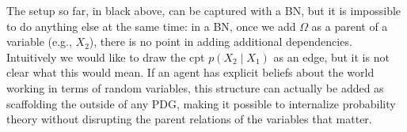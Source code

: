 \documentclass{article}
\newcommand{\MN}{PDG}
\numberwithin{equation}{section}
\begin{document}
{\begin{example}
\begin{center}
{}
		\end{center}
		The setup so far, in black above, can be captured with
                a BN, but it is impossible to do anything else at the
                same time: in a BN, once we add $\Omega$ as a parent
                of a variable (e.g., $X_2$), there is no point in
                adding additional dependencies. Intuitively we would
                like to draw the cpt $p(X_2 \mid X_1)$ as an edge, but
                it is not clear what this would mean.		 
		If an agent has explicit beliefs about the world
                working in terms of random variables, this structure
                can actually be added as scaffolding the outside of
                any \MN, making it possible to internalize probability
                theory without disrupting the parent relations of the
                variables that matter. 
	\end{example}
}
\end{document}
